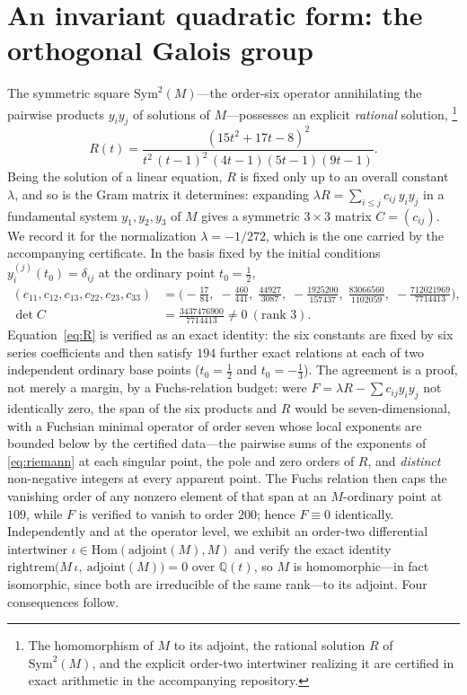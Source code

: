 \documentclass[11pt]{article}
\theoremstyle{plain}
\theoremstyle{remark}
\begin{document}
\section{An invariant quadratic form: the orthogonal Galois group}
\label{sec:orthogonal}
The symmetric square $\mathrm{Sym}^2(M)$---the order-six operator annihilating the pairwise products $y_iy_j$ of
solutions of $M$---possesses an explicit \emph{rational} solution,%
\footnote{The homomorphism of $M$ to its adjoint, the rational solution $R$ of $\mathrm{Sym}^2(M)$, and the
explicit order-two intertwiner realizing it are certified in exact arithmetic in the accompanying repository.}
\begin{equation}
R(t)=\frac{(15t^2+17t-8)^2}{t^2\,(t-1)^2\,(4t-1)(5t-1)(9t-1)}.
\label{eq:R}
\end{equation}
Being the solution of a linear equation, $R$ is fixed only up to an overall constant $\lambda$, and so is the
Gram matrix it determines: expanding $\lambda R=\sum_{i\le j}c_{ij}\,y_iy_j$ in a fundamental system
$y_1,y_2,y_3$ of $M$ gives a symmetric $3\times3$ matrix $C=(c_{ij})$. We record it for the normalization
$\lambda=-1/272$, which is the one carried by the accompanying certificate. In the basis fixed by the initial
conditions $y_i^{(j)}(t_0)=\delta_{ij}$ at the ordinary point $t_0=\tfrac12$,
{\small
\begin{equation}
\begin{split}
(c_{11},c_{12},c_{13},c_{22},c_{23},c_{33})&=
\Big(-\tfrac{17}{84},\;-\tfrac{460}{441},\;\tfrac{44927}{3087},\;
-\tfrac{1925200}{157437},\;\tfrac{83066560}{1102059},\;-\tfrac{712021969}{7714413}\Big),\\[2pt]
\det C&=\tfrac{3437476900}{7714413}\neq0\ (\text{rank }3).
\end{split}
\end{equation}}
Equation~\eqref{eq:R} is verified as an exact identity:
the six constants are fixed by six series coefficients and then satisfy $194$ further exact relations at
each of two independent ordinary base points ($t_0=\tfrac12$ and $t_0=-\tfrac13$). The agreement is a proof, not
merely a margin, by a Fuchs-relation budget: were $F=\lambda R-\sum c_{ij}y_iy_j$ not identically zero, the span of the six
products and $R$ would be seven-dimensional, with a Fuchsian minimal operator of order seven whose local exponents
are bounded below by the certified data---the pairwise sums of the exponents of \eqref{eq:riemann} at each singular
point, the pole and zero orders of $R$, and \emph{distinct} non-negative integers at every apparent point. The
Fuchs relation then caps the vanishing order of any nonzero element of that span at an $M$-ordinary point at
$109$, while $F$ is verified to vanish to order $200$; hence $F\equiv0$ identically. Independently and at the operator level,
we exhibit an order-two differential intertwiner $\iota\in\mathrm{Hom}(\mathrm{adjoint}(M),M)$ and verify the exact
identity $\mathrm{rightrem}\big(M\,\iota,\ \mathrm{adjoint}(M)\big)=0$ over $\mathbb{Q}(t)$, so $M$ is homomorphic---in
fact isomorphic, since both are irreducible of the same rank---to its adjoint. Four consequences follow.
\end{document}
